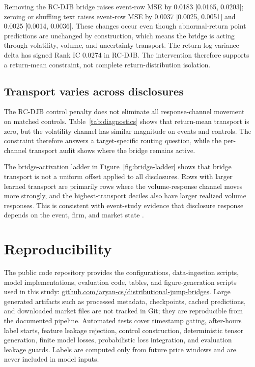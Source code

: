 \documentclass[10pt,letterpaper]{article}
\begin{document}
Removing the RC-DJB bridge raises event-row MSE by 0.0183 [0.0165, 0.0203]; zeroing or shuffling
text raises event-row MSE by 0.0037 [0.0025, 0.0051] and 0.0025 [0.0014, 0.0036]. These changes
occur even though abnormal-return point predictions are unchanged by construction, which means the
bridge is acting through volatility, volume, and uncertainty transport. The return log-variance
delta has signed Rank IC 0.0274 in RC-DJB. The intervention therefore supports a return-mean
constraint, not complete return-distribution isolation.

\subsection{Transport varies across disclosures}
The RC-DJB control penalty does not eliminate all response-channel movement on matched controls.
Table~\ref{tab:diagnostics} shows that return-mean transport is zero, but the volatility channel
has similar magnitude on events and controls. The constraint therefore answers a target-specific
routing question, while the per-channel transport audit shows where the bridge remains active.

The bridge-activation ladder in Figure~\ref{fig:bridge-ladder} shows that bridge transport is not a
uniform offset applied to all disclosures. Rows with larger learned transport are primarily rows
where the volume-response channel moves more strongly, and the highest-transport deciles also have
larger realized volume responses. This is consistent with event-study evidence that disclosure
response depends on the event, firm, and market state
\citep{beaver1968information,patell1984anticipated,kothari2007econometrics}.

\section{Reproducibility}

The public code repository provides the configurations, data-ingestion scripts, model
implementations, evaluation code, tables, and figure-generation scripts used in this study:
\href{https://github.com/aryan-cs/distributional-jump-bridges}{github.com/aryan-cs/distributional-jump-bridges}. Large generated artifacts such as processed
metadata, checkpoints, cached predictions, and downloaded market files are not tracked in Git; they
are reproducible from the documented pipeline. Automated tests cover timestamp gating, after-hours
label starts, feature leakage rejection, control construction, deterministic tensor generation,
finite model losses, probabilistic loss integration, and evaluation leakage guards. Labels are
computed only from future price windows and are never included in model inputs.
\end{document}
